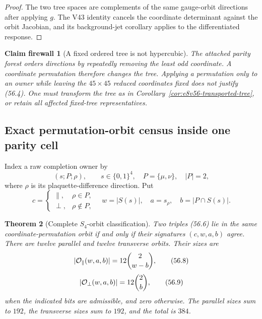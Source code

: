\documentclass[11pt,oneside]{book}
\newtheorem{theorem}{Theorem}[chapter]
\newtheorem{firewall}[theorem]{Claim firewall}
\theoremstyle{definition}
\theoremstyle{remark}
\begin{document}
\begin{proof}
The two tree spaces are complements of the same gauge-orbit
directions after applying \(g\).  The V43 identity cancels the
coordinate determinant against the orbit Jacobian, and its
background-jet corollary applies to the differentiated response.
\end{proof}

\begin{firewall}[A fixed ordered tree is not hypercubic]
\label{fire:e8v56-fixed-tree}
The attached parity forest orders directions by repeatedly
removing the least odd coordinate.  A coordinate permutation
therefore changes the tree.  Applying a permutation only to an
owner while leaving the \(45\times45\) reduced coordinates fixed
does not justify (56.4).  One must transform the tree as in
Corollary~\ref{cor:e8v56-transported-tree}, or retain all affected
fixed-tree representatives.
\end{firewall}

\subsection{Exact permutation-orbit census inside one parity cell}

Index a raw completion owner by
\[
 (s;P;\rho),\qquad
 s\in\{0,1\}^4,\quad P=\{\mu,\nu\},\quad |P|=2,               \tag{56.6}
\]
where \(\rho\) is its plaquette-difference direction.  Put
\[
 c=\begin{cases}\parallel,&\rho\in P,\\
                  \perp,&\rho\notin P,\end{cases}\quad
 w=|S(s)|,\quad a=s_\rho,\quad b=|P\cap S(s)|.                \tag{56.7}
\]

\begin{theorem}[Complete \(S_4\)-orbit classification]
\label{thm:e8v56-orbit-classification}
Two triples (56.6) lie in the same coordinate-permutation orbit if
and only if their signatures \((c,w,a,b)\) agree.  There are
twelve parallel and twelve transverse orbits.  Their sizes are
\[
 |{\cal O}_{\parallel}(w,a,b)|
 =12\binom2{w-b},                                             \tag{56.8}
\]
\[
 |{\cal O}_{\perp}(w,a,b)|
 =12\binom2b,                                                 \tag{56.9}
\]
when the indicated bits are admissible, and zero otherwise.
The parallel sizes sum to \(192\), the transverse sizes sum to
\(192\), and the total is \(384\).
\end{theorem}
\end{document}
